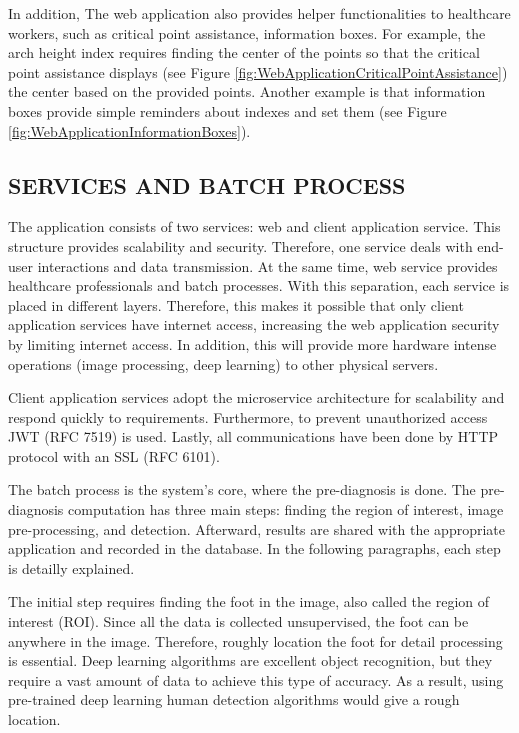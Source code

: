 In addition, The web application also provides helper functionalities to healthcare workers, such as critical point assistance, information boxes. For example, the arch height index requires finding the center of the points so that the critical point assistance displays (see Figure \ref{fig:WebApplicationCriticalPointAssistance}) the center based on the provided points. Another example is that information boxes provide simple reminders about indexes and set them (see Figure \ref{fig:WebApplicationInformationBoxes}).

\subsection{SERVICES AND BATCH PROCESS} \label{sec:StudyIServicesAndBatchProcess}
The application consists of two services: web and client application service. This structure provides scalability and security. Therefore, one service deals with end-user interactions and data transmission. At the same time, web service provides healthcare professionals and batch processes. With this separation, each service is placed in different layers. Therefore, this makes it possible that only client application services have internet access, increasing the web application security by limiting internet access.  In addition, this will provide more hardware intense operations (image processing, deep learning) to other physical servers. 

Client application services adopt the microservice architecture for scalability and respond quickly to requirements. Furthermore, to prevent unauthorized access JWT (RFC 7519) is used. Lastly, all communications have been done by HTTP protocol with an SSL (RFC 6101). 

The batch process is the system's core, where the pre-diagnosis is done. The pre-diagnosis computation has three main steps: finding the region of interest, image pre-processing, and detection. Afterward, results are shared with the appropriate application and recorded in the database. In the following paragraphs, each step is detailly explained.

The initial step requires finding the foot in the image, also called the region of interest (ROI).  Since all the data is collected unsupervised, the foot can be anywhere in the image. Therefore, roughly location the foot for detail processing is essential. Deep learning algorithms are excellent object recognition, but they require a vast amount of data to achieve this type of accuracy. As a result, using pre-trained deep learning human detection algorithms would give a rough location.

